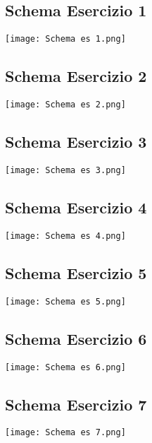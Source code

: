 \documentclass[a4paper]{article}
\begin{document}
\subsection{Schema Esercizio 1}
\begin{center}
\texttt{[image: Schema es 1.png]}
\end{center}

\subsection{Schema Esercizio 2}
\begin{center}
\texttt{[image: Schema es 2.png]}
\end{center}
\clearpage

\subsection{Schema Esercizio 3}
\begin{center}
\texttt{[image: Schema es 3.png]}
\end{center}
\clearpage

\subsection{Schema Esercizio 4}
\begin{center}
\texttt{[image: Schema es 4.png]}
\end{center}
\clearpage

\subsection{Schema Esercizio 5}
\begin{center}
\texttt{[image: Schema es 5.png]}
\end{center}
\clearpage

\subsection{Schema Esercizio 6}
\begin{center}
\texttt{[image: Schema es 6.png]}
\end{center}
\clearpage

\subsection{Schema Esercizio 7}
\begin{center}
\texttt{[image: Schema es 7.png]}
\end{center}
\clearpage
\end{document}
